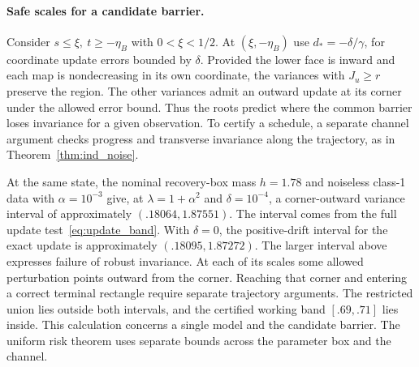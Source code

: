 \paragraph{Safe scales for a candidate barrier.}
Consider $s\le\xi,\ t\ge-\eta_B$ with $0<\xi<1/2$.
At $(\xi,-\eta_B)$ use $d_*=-\delta/\gamma$, for coordinate
update errors bounded by $\delta$. Provided the lower face is
inward and each map is nondecreasing in its own coordinate,
the variances with $J_u\ge r$ preserve the region. The other
variances admit an outward update at its corner under the allowed
error bound. Thus the roots predict where the common barrier loses
invariance for a given observation. To certify a schedule, a
separate channel argument checks progress and transverse
invariance along the trajectory, as in Theorem~\ref{thm:ind_noise}.

At the same state, the nominal recovery-box mass $h=1.78$ and
noiseless class-1 data with $\alpha=10^{-3}$ give, at
$\lambda=1+\alpha^2$ and $\delta=10^{-4}$, a corner-outward
variance interval of approximately $(.18064,1.87551)$.
The interval comes from the full update test~\eqref{eq:update_band}.
With $\delta=0$, the positive-drift interval for the exact update
is approximately $(.18095,1.87272)$. The larger interval above
expresses failure of robust invariance. At each of its scales some
allowed perturbation points outward from the corner. Reaching that
corner and entering a correct terminal rectangle require separate
trajectory arguments.
The restricted union lies outside both intervals, and the certified
working band $[.69,.71]$ lies inside. This calculation concerns a
single model and the candidate barrier. The uniform risk theorem
uses separate bounds across the parameter box and the channel.
